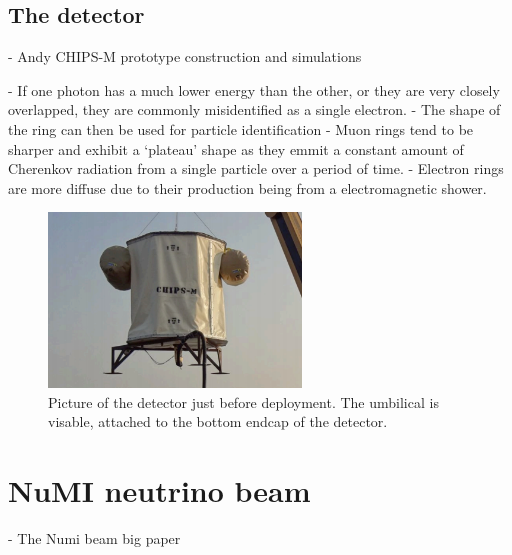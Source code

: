 \subsection{The \chipsm detector} %
\label{sec:chips_concept_m} %

- Andy CHIPS-M prototype construction and simulations~\cite{perch2015}

- If one photon has a much lower energy than the other, or they are very closely overlapped,
they are commonly misidentified as a single electron.
- The shape of the ring can then be used for particle identification
- Muon rings tend to be sharper and exhibit a `plateau' shape as they emmit a constant amount of
Cherenkov radiation from a single particle over a period of time.
- Electron rings are more diffuse due to their production being from a electromagnetic shower.

\begin{figure} %
    \includegraphics[width=0.6\textwidth]{diagrams/4-chips/chips_m.png}
    \caption[Picture of the \chipsm detector.]
    {Picture of the \chipsm detector just before deployment. The umbilical is visable, attached to
        the bottom endcap of the detector.}
    \label{fig:chips_m}
\end{figure}

\section{NuMI neutrino beam} %
\label{sec:chips_numi} %

- The Numi beam big paper~\cite{adamson2016}

